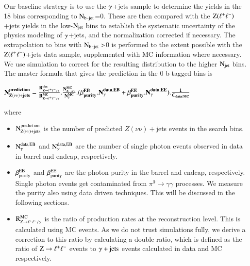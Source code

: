 Our baseline strategy is to use the $\rm \gamma$+jets  sample to determine the
yields in the 18 bins corresponding to $\rm N_{b\texttt{-}jet}$=0.  These are
then compared with the $\rm Z(\ell^{+} \ell^{-})$+jets yields in the low-$\rm N_{jet}$
bins to establish the systematic uncertainty of the physics modeling of
$\rm \gamma$+jets, and the normalization corrected if necessary.  
The extrapolation to bins with $\rm N_{b\texttt{-}jet} >$0 is performed to
the extent possible with the $\rm Z(\ell^{+} \ell^{-})$+jets data sample, supplemented with MC
information where necessary. We use simulation to correct for the
resulting distribution to the higher $\rm N_{jet}$ bins. The master formula that gives the prediction in the 0 b-tagged bins is



$\bf  N_{Z(\nu\nu)+jets}^{prediction} = \frac{R^{obs}_{Z\rightarrow\ell^{+}\ell^{-}/\gamma}}{R^{MC}_{Z\rightarrow\ell^{+}\ell^{-}/\gamma}} . \frac{N_{Z\rightarrow \nu\bar{\nu}}^{MC}}{N_{\gamma}^{MC}} . (\beta^{EB}_{purity}.N^{data,EB}_{\gamma}+ \beta^{EE}_{purity}.N^{data,EE}_{\gamma}). \frac{1}{C_{data/MC}}$




where 

\begin{itemize}

\item $\bf \rm N_{Z(\nu\nu)+\rm jets}^{prediction}$ is the number of predicted $Z(\nu\nu)+$jets events in the search bins.


\item $\bf \rm N^{data,EB}_{\gamma}$ and $\rm N^{data,EB}_{\gamma}$ are the number of single photon events observed in data in barrel and endcap, respectively.


\item  $\bf \rm \beta^{EB}_{purity}$ and $\beta^{\rm EE}_{\rm purity}$ are the photon purity in the barrel and endcap, respectively. Single photon events get contaminated from $\pi^{0} \rightarrow \gamma\gamma$ processes. We measure the purity also using data driven techniques. This will be discussed in the following sections. 



\item $\bf \rm R^{MC}_{Z\rightarrow\ell^{+}\ell^{-}/\gamma}$ is the ratio of production rates at the reconstruction level. This is calculated using MC events. As we do not trust simulations fully, we derive a correction to this ratio by calculating a double ratio, which is defined as the ratio of  $\rm Z\rightarrow\ell^{+}\ell^{-}$ events to $\rm \gamma + jets$ events calculated in data and MC respectively.


\end{itemize}


